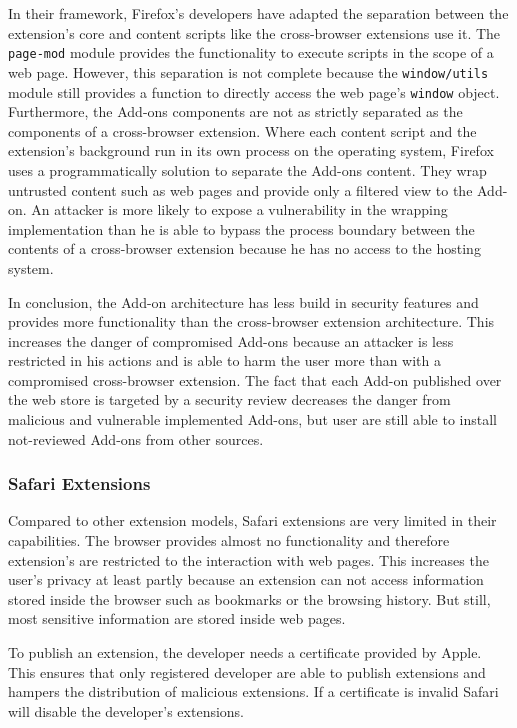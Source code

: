 	In their framework, Firefox's developers have adapted the separation between the extension's core and content scripts like the cross-browser extensions use it. The \texttt{page-mod} module provides the functionality to execute scripts in the scope of a web page. However, this separation is not complete because the \texttt{window/utils} module still provides a function to directly access the web page's \texttt{window} object.  \\
	Furthermore, the Add-ons components are not as strictly separated as the components of a cross-browser extension. Where each content script and the extension's background run in its own process on the operating system, Firefox uses a programmatically solution to separate the Add-ons content. They wrap untrusted content such as web pages and provide only a filtered view to the Add-on. An attacker is more likely to expose a vulnerability in the wrapping implementation than he is able to bypass the process boundary between the contents of a cross-browser extension because he has no access to the hosting system.
	
	In conclusion, the Add-on architecture has less build in security features and provides more functionality than the cross-browser extension architecture. This increases the danger of compromised Add-ons because an attacker is less restricted in his actions and is able to harm the user more than with a compromised cross-browser extension. The fact that each Add-on published over the web store is targeted by a security review decreases the danger from malicious and vulnerable implemented Add-ons, but user are still able to install not-reviewed Add-ons from other sources. 
	
\subsubsection{Safari Extensions}

	Compared to other extension models, Safari extensions are very limited in their capabilities. The browser provides almost no functionality and therefore extension's are restricted to the interaction with web pages. This increases the user's privacy at least partly because an extension can not access information stored inside the browser such as bookmarks or the browsing history. But still, most sensitive information are stored inside web pages. 
	
	To publish an extension, the developer needs a certificate provided by Apple. This ensures that only registered developer are able to publish extensions and hampers the distribution of malicious extensions. If a certificate is invalid Safari will disable the developer's extensions.
	
